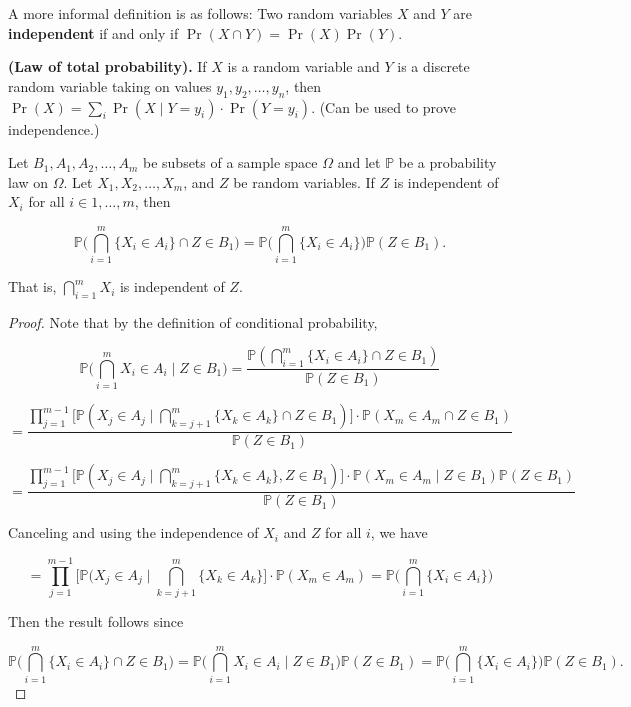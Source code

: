 \begin{remark}A more informal definition is as follows: Two random variables \(X\) and \(Y\) are \textbf{independent} if and only if \(\Pr(X \cap Y) = \Pr(X) \Pr(Y)\).\end{remark}

\begin{theorem} \textbf{(Law of total probability).} If \(X\) is a random variable and \(Y\) is a discrete random variable taking on values \(y_1, y_2, \ldots, y_n\), then \(\Pr(X) = \sum_i \Pr(X \mid Y = y_i) \cdot \Pr(Y = y_i)\). (Can be used to prove independence.)\end{theorem}

\begin{lemma}\label{prob.indep.prod} Let \(B_1, A_1, A_2, \ldots, A_m\) be subsets of a sample space \(\Omega\) and let \(\mathbb{P}\) be a probability law on \(\Omega\). Let \(X_1, X_2, \ldots, X_m\), and \(Z\) be random variables. If $Z$ is independent of \(X_i\) for all \(i \in 1, \ldots, m\), then

\[
\mathbb{P} \bigg(\bigcap_{i=1}^m \{X_i \in A_i\} \cap Z \in B_1  \bigg) = \mathbb{P} \Bigg( \bigcap_{i=1}^m \{X_i \in A_i\}\Bigg) \mathbb{P}(Z \in B_1).
\]

That is, \(\bigcap_{i=1}^m X_i\) is independent of \(Z\).

\end{lemma}

\begin{proof} Note that by the definition of conditional probability,

\[
\mathbb{P}\bigg(\bigcap_{i=1}^m X_i \in A_i \mid Z \in B_1\bigg) = \frac{\mathbb{P}(\bigcap_{i=1}^m \{X_i \in A_i \}\cap Z \in B_1)}{\mathbb{P}(Z \in B_1)}
\]

\[
= \frac{\prod_{j=1}^{m-1} \big[ \mathbb{P}(X_j \in A_j \mid  \bigcap_{k= j+1}^m \{X_{k} \in A_{k}\} \cap  Z \in B_1) \big]  \cdot \mathbb{P}(X_m \in A_m \cap Z \in B_1)  }{\mathbb{P}(Z \in B_1)}
\]

\[
= \frac{\prod_{j=1}^{m-1} \big[ \mathbb{P}(X_j \in A_j \mid  \bigcap_{k= j+1}^m \{X_{k} \in A_{k}\} ,  Z \in B_1) \big]  \cdot \mathbb{P}(X_m \in A_m \mid Z \in B_1) \mathbb{P}(Z \in B_1)  }{\mathbb{P}(Z \in B_1)}
\]


Canceling and using the independence of \(X_i\) and \(Z\) for all \(i\), we have

\[
= \prod_{j=1}^{m-1} \big[ \mathbb{P}(X_j \in A_j \mid  \bigcap_{k= j+1}^m \{X_{k} \in A_{k}\}  \big]  \cdot \mathbb{P}(X_m \in A_m ) =  \mathbb{P} \Bigg( \bigcap_{i=1}^m \{X_i \in A_i\}\Bigg)
\]

Then the result follows since

\[
\mathbb{P} \bigg(\bigcap_{i=1}^m \{X_i \in A_i\} \cap Z \in B_1  \bigg) =  \mathbb{P}\bigg(\bigcap_{i=1}^m X_i \in A_i \mid Z \in B_1\bigg) \mathbb{P}(Z \in B_1) = \mathbb{P} \Bigg( \bigcap_{i=1}^m \{X_i \in A_i\}\Bigg) \mathbb{P}(Z \in B_1).
\]

\end{proof}


